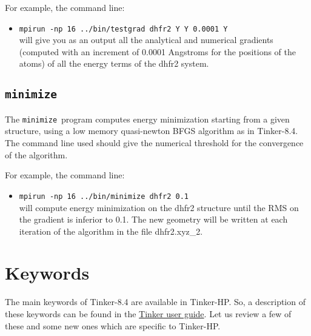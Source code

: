\documentclass[peerreview]{IEEEtran}
\def\minimize{\texttt{minimize}}
\def\mpirun{\texttt{mpirun -np}}
\def\baoabpiston{\textbf{\textsc{BaoabPiston}}}
\newlength{\mylen}
\begin{document}
For example, the command line:
\begin{itemize}
\item []\mpirun\texttt{  16 ../bin/testgrad dhfr2 Y Y 0.0001 Y} \\
will give you as an output all the analytical and numerical gradients (computed with an increment of 0.0001 Angstroms for the positions of the atoms) of all the energy terms of the dhfr2 system.
\end{itemize}
\subsection{\minimize}
The \minimize\ program computes energy minimization starting from a given structure, using a low memory quasi-newton BFGS algorithm as in Tinker-8.4. The command line used should give the numerical threshold for the convergence of the algorithm.

For example, the command line:
\begin{itemize}
\item []\mpirun\texttt{  16 ../bin/minimize dhfr2 0.1} \\
will compute energy minimization on the dhfr2 structure until the RMS on the gradient is inferior to 0.1. The new geometry will be written at each iteration of the algorithm in the file dhfr2.xyz\_2.
\end{itemize}
\section{Keywords}
The main keywords of Tinker-8.4 are available in Tinker-HP. So, a description of these keywords can be found in the \href{https://dasher.wustl.edu/tinker/downloads/guide.pdf}{Tinker user guide}. Let us review a few of these and some new ones which are specific to  Tinker-HP.

\settowidth{\mylen}{\baoabpiston}
\end{document}
